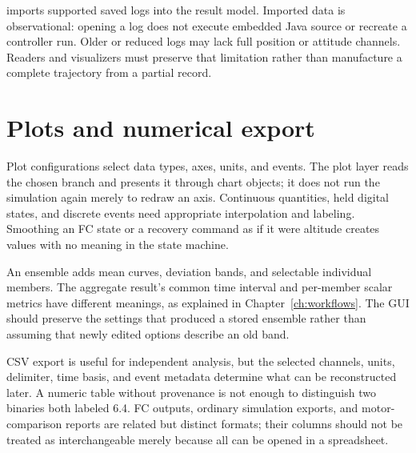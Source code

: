  imports supported saved logs into the result model. Imported data is observational: opening a log does not execute embedded Java source or recreate a controller run. Older or reduced logs may lack full position or attitude channels. Readers and visualizers must preserve that limitation rather than manufacture a complete trajectory from a partial record.


\section{Plots and numerical export}
Plot configurations select data types, axes, units, and events. The plot layer reads the chosen branch and presents it through chart objects; it does not run the simulation again merely to redraw an axis. Continuous quantities, held digital states, and discrete events need appropriate interpolation and labeling. Smoothing an FC state or a recovery command as if it were altitude creates values with no meaning in the state machine.

An ensemble adds mean curves, deviation bands, and selectable individual members. The aggregate result's common time interval and per-member scalar metrics have different meanings, as explained in Chapter~\ref{ch:workflows}. The GUI should preserve the settings that produced a stored ensemble rather than assuming that newly edited options describe an old band.

CSV export is useful for independent analysis, but the selected channels, units, delimiter, time basis, and event metadata determine what can be reconstructed later. A numeric table without provenance is not enough to distinguish two binaries both labeled 6.4. FC outputs, ordinary simulation exports, and motor-comparison reports are related but distinct formats; their columns should not be treated as interchangeable merely because all can be opened in a spreadsheet.


